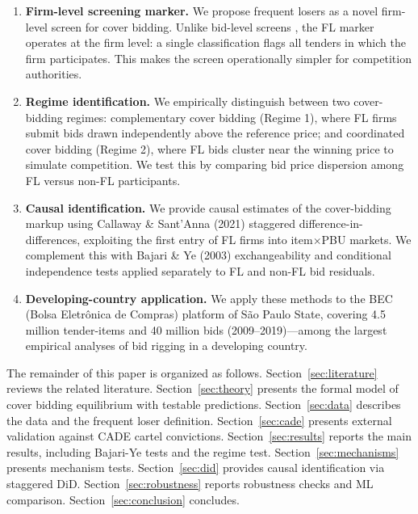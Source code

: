 \documentclass[10pt]{article}
\begin{document}
\begin{enumerate}
\item \textbf{Firm-level screening marker.} We propose frequent losers as a novel firm-level screen for cover bidding. Unlike bid-level screens \citep{bajari2003deciding, imhof2019detecting}, the FL marker operates at the firm level: a single classification flags all tenders in which the firm participates. This makes the screen operationally simpler for competition authorities.

\item \textbf{Regime identification.} We empirically distinguish between two cover-bidding regimes: complementary cover bidding (Regime 1), where FL firms submit bids drawn independently above the reference price; and coordinated cover bidding (Regime 2), where FL bids cluster near the winning price to simulate competition. We test this by comparing bid price dispersion among FL versus non-FL participants.

\item \textbf{Causal identification.} We provide causal estimates of the cover-bidding markup using Callaway \& Sant'Anna (2021) staggered difference-in-differences, exploiting the first entry of FL firms into item$\times$PBU markets. We complement this with Bajari \& Ye (2003) exchangeability and conditional independence tests applied separately to FL and non-FL bid residuals.

\item \textbf{Developing-country application.} We apply these methods to the BEC (Bolsa Eletr\^{o}nica de Compras) platform of S\~{a}o Paulo State, covering 4.5 million tender-items and 40 million bids (2009--2019)---among the largest empirical analyses of bid rigging in a developing country.
\end{enumerate}

The remainder of this paper is organized as follows. Section~\ref{sec:literature} reviews the related literature. Section~\ref{sec:theory} presents the formal model of cover bidding equilibrium with testable predictions. Section~\ref{sec:data} describes the data and the frequent loser definition. Section~\ref{sec:cade} presents external validation against CADE cartel convictions. Section~\ref{sec:results} reports the main results, including Bajari-Ye tests and the regime test. Section~\ref{sec:mechanisms} presents mechanism tests. Section~\ref{sec:did} provides causal identification via staggered DiD. Section~\ref{sec:robustness} reports robustness checks and ML comparison. Section~\ref{sec:conclusion} concludes.
\end{document}
